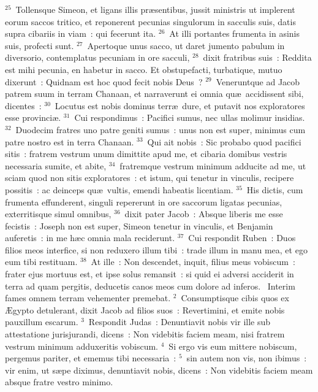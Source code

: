 ${}^{25}$~Tollensque Simeon, et ligans illis pr\ae sentibus, jussit ministris ut implerent eorum saccos tritico, et reponerent pecunias singulorum in sacculis suis, datis supra cibariis in viam~: qui fecerunt ita.
${}^{26}$~At illi portantes frumenta in asinis suis, profecti sunt.
${}^{27}$~Apertoque unus sacco, ut daret jumento pabulum in diversorio, contemplatus pecuniam in ore sacculi,
${}^{28}$~dixit fratribus suis~: Reddita est mihi pecunia, en habetur in sacco. Et obstupefacti, turbatique, mutuo dixerunt~: Quidnam est hoc quod fecit nobis Deus~?
${}^{29}$~Veneruntque ad Jacob patrem suum in terram Chanaan, et narraverunt ei omnia qu\ae\ accidissent sibi, dicentes~:
${}^{30}$~Locutus est nobis dominus terr\ae\ dure, et putavit nos exploratores esse provinci\ae .
${}^{31}$~Cui respondimus~: Pacifici sumus, nec ullas molimur insidias.
${}^{32}$~Duodecim fratres uno patre geniti sumus~: unus non est super, minimus cum patre nostro est in terra Chanaan.
${}^{33}$~Qui ait nobis~: Sic probabo quod pacifici sitis~: fratrem vestrum unum dimittite apud me, et cibaria domibus vestris necessaria sumite, et abite,
${}^{34}$~fratremque vestrum minimum adducite ad me, ut sciam quod non sitis exploratores~: et istum, qui tenetur in vinculis, recipere possitis~: ac deinceps qu\ae\ vultis, emendi habeatis licentiam.
${}^{35}$~His dictis, cum frumenta effunderent, singuli repererunt in ore saccorum ligatas pecunias, exterritisque simul omnibus,
${}^{36}$~dixit pater Jacob~: Absque liberis me esse fecistis~: Joseph non est super, Simeon tenetur in vinculis, et Benjamin auferetis~: in me h\ae c omnia mala reciderunt.
${}^{37}$~Cui respondit Ruben~: Duos filios meos interfice, si non reduxero illum tibi~: trade illum in manu mea, et ego eum tibi restituam.
${}^{38}$~At ille~: Non descendet, inquit, filius meus vobiscum~: frater ejus mortuus est, et ipse solus remansit~: si quid ei adversi acciderit in terra ad quam pergitis, deducetis canos meos cum dolore ad inferos.
~Interim fames omnem terram vehementer premebat.
${}^{2}$~Consumptisque cibis quos ex \AE gypto detulerant, dixit Jacob ad filios suos~: Revertimini, et emite nobis pauxillum escarum.
${}^{3}$~Respondit Judas~: Denuntiavit nobis vir ille sub attestatione jurisjurandi, dicens~: Non videbitis faciem meam, nisi fratrem vestrum minimum adduxeritis vobiscum.
${}^{4}$~Si ergo vis eum mittere nobiscum, pergemus pariter, et ememus tibi necessaria~:
${}^{5}$~sin autem non vis, non ibimus~: vir enim, ut s\ae pe diximus, denuntiavit nobis, dicens~: Non videbitis faciem meam absque fratre vestro minimo.
